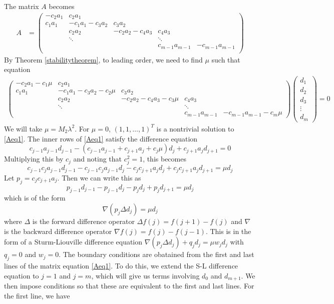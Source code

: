 \documentclass[12pt]{article}
\begin{document}
The matrix $A$ becomes
\begin{align}\label{AdNLS}
A &= \begin{pmatrix}
-c_2 a_1 & c_2 a_1 & & &  \\
c_1 a_1 & -c_1 a_1 - c_3 a_2 & c_3 a_2 \\
& c_2 a_2 & -c_2 a_2 - c_4 a_3 & c_4 a_3 \\
& \ddots & & \ddots \\
& & & c_{m-1} a_{m-1} & -c_{m-1} a_{m-1}  \\
\end{pmatrix}
\end{align}
By Theorem \ref{stabilitytheorem}, to leading order, we need to find $\mu$ such that equation 
\begin{align}\label{Aeq1}
\begin{pmatrix}
-c_2 a_1 - c_1 \mu & c_2 a_1 & & &  \\
c_1 a_1 & -c_1 a_1 - c_3 a_2 - c_2 \mu & c_3 a_2 \\
& c_2 a_2 & -c_2 a_2 - c_4 a_3 - c_3 \mu & c_4 a_3 \\
& \ddots & & \ddots \\
& & & c_{m-1} a_{m-1} & -c_{m-1} a_{m-1} - c_m \mu 
\end{pmatrix}
\begin{pmatrix}d_1 \\ d_2 \\ d_3 \\ \vdots \\ d_m \end{pmatrix} 
 = 0
\end{align}
We will take $\mu = M_2 \lambda^2$. For $\mu = 0$, $(1, 1, \dots, 1)^T$ is a nontrivial solution to \eqref{Aeq1}. The inner rows of \eqref{Aeq1} satisfy the difference equation
\[
c_{j-1} a_{j-1} d_{j-1} - (c_{j-1}a_{j-1} + c_{j+1}a_j + c_j \mu) d_j
+ c_{j+1} a_j d_{j+1} = 0
\]
Multiplying this by $c_j$ and noting that $c_j^2 = 1$, this becomes
\[
c_{j-1} c_j a_{j-1} d_{j-1} - c_{j-1} c_j a_{j-1} d_j - c_j c_{j+1} a_j d_j
+ c_j c_{j+1} a_j d_{j+1} = \mu d_j
\]
Let $p_j = c_j c_{j+1} a_j$. Then we can write this as
\[
p_{j-1} d_{j-1} - p_{j-1} d_j - p_j d_j
+ p_j d_{j+1} = \mu d_j
\]
which is of the form
\[
\nabla( p_j \Delta d_j ) = \mu d_j
\]
where $\Delta$ is the forward difference operator $\Delta f(j) = f(j+1) - f(j)$ and $\nabla$ is the backward difference operator $\nabla f(j) = f(j) - f(j-1)$. This is in the form of a Sturm-Liouville difference equation $\nabla( p_j \Delta d_j ) + q_j d_j = \mu w_j d_j$ with $q_j = 0$ and $w_j = 0$. The boundary conditions are obatained from the first and last lines of the matrix equation \eqref{Aeq1}. To do this, we extend the S-L difference equation to $j = 1$ and $j = m$, which will give us terms involving $d_0$ and $d_{m+1}$. We then impose conditions so that these are equivalent to the first and last lines. For the first line, we have
\end{document}
